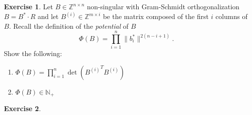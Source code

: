 \documentclass[12pt,a4paper]{article}
\theoremstyle{plain}
\newtheorem*{Sol*}{Solution}
\theoremstyle{definition}
\newtheorem{Ex}{Exercise}
\newif\ifsolutions
\newcommand{\exercise}[2]{
			\begin{Ex} #1 \end{Ex}
			\ifsolutions  \begin{Sol*} #2 \end{Sol*} \bigskip \else \bigskip  \fi
		}
\begin{document}
  \exercise{
    Let $B ∈ℤ^{n×n}$ non-singular with Gram-Schmidt orthogonalization $B = B^*⋅ R$ and let $B^{(i)} ∈ℤ^{m ×i}$ be the matrix composed of the first $i$ columns of $B$.  Recall the definition of the \emph{potential} of $B$
    \begin{displaymath}
      Φ(B) = ∏_{i=1}^n \|b_i^*\|^{2(n-i+1)}.
    \end{displaymath}
    Show the following:
    \begin{enumerate}
    \item $ Φ(B) = ∏_{i=1}^n \det\left({B^{(i)}}^T B^{(i)}\right)$
    \item $ Φ(B) ∈ ℕ_+$  
    \end{enumerate}
  }{}


  \exercise{

    }{}
  
\end{document}
